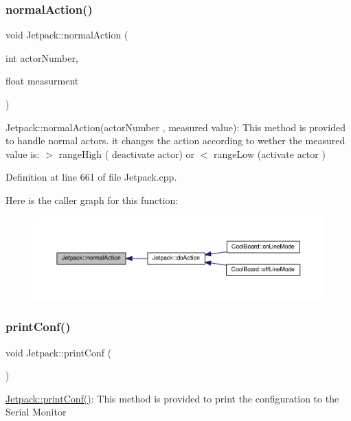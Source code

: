 \subsubsection{\texorpdfstring{normal\+Action()}{normalAction()}}
{\footnotesize\ttfamily void Jetpack\+::normal\+Action (\begin{DoxyParamCaption}\item[{int}]{actor\+Number,  }\item[{float}]{measurment }\end{DoxyParamCaption})}

Jetpack\+::normal\+Action(actor\+Number , measured value)\+: This method is provided to handle normal actors. it changes the action according to wether the measured value is\+: $>$ range\+High ( deactivate actor) or $<$ range\+Low (activate actor ) 

Definition at line 661 of file Jetpack.\+cpp.

Here is the caller graph for this function\+:\nopagebreak
\begin{figure}[H]
\begin{center}
\leavevmode
\includegraphics[width=350pt]{class_jetpack_a65ce9533c39fa71e4945b970bf14b980_icgraph}
\end{center}
\end{figure}
\mbox{\label{class_jetpack_ac54a7bb4f9166bee32052253d9b1d306}} 
\subsubsection{\texorpdfstring{print\+Conf()}{printConf()}}
{\footnotesize\ttfamily void Jetpack\+::print\+Conf (\begin{DoxyParamCaption}{ }\end{DoxyParamCaption})}

\hyperlink{class_jetpack_ac54a7bb4f9166bee32052253d9b1d306}{Jetpack\+::print\+Conf()}\+: This method is provided to print the configuration to the Serial Monitor 

